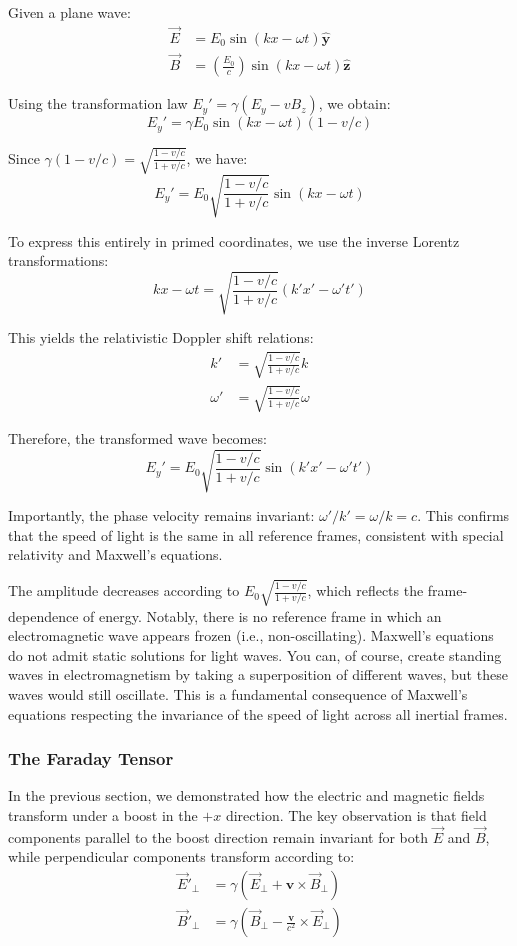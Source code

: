 \documentclass{article}
\begin{document}
Given a plane wave:
\begin{align*}
\vec{E} &= E_0 \sin(kx - \omega t) \hat{\mathbf{y}} \\
\vec{B} &= (\frac{E_0}{c}) \sin(kx - \omega t) \hat{\mathbf{z}}
\end{align*}

Using the transformation law $E_y' = \gamma(E_y - vB_z)$, we obtain:
\[E_y' = \gamma E_0 \sin(kx - \omega t)(1 - v/c)\]

Since $\gamma(1 - v/c) = \sqrt{\frac{1 - v/c}{1 + v/c}}$, we have:
\[E_y' = E_0 \sqrt{\frac{1 - v/c}{1 + v/c}} \sin(kx - \omega t)\]

To express this entirely in primed coordinates, we use the inverse Lorentz transformations:
\[kx - \omega t = \sqrt{\frac{1 - v/c}{1 + v/c}}(k'x' - \omega' t')\]

This yields the relativistic Doppler shift relations:
\begin{align*}
k' &= \sqrt{\frac{1 - v/c}{1 + v/c}} k \\
\omega' &= \sqrt{\frac{1 - v/c}{1 + v/c}} \omega
\end{align*}

Therefore, the transformed wave becomes:
\[E_y' = E_0 \sqrt{\frac{1 - v/c}{1 + v/c}} \sin(k'x' - \omega' t')\]

Importantly, the phase velocity remains invariant: $\omega'/k' = \omega/k = c$. This confirms that the speed of light is the same in all reference frames, consistent with special relativity and Maxwell's equations.

The amplitude decreases according to $E_0 \sqrt{\frac{1 - v/c}{1 + v/c}}$, which reflects the frame-dependence of energy. Notably, there is no reference frame in which an electromagnetic wave appears frozen (i.e., non-oscillating). Maxwell's equations do not admit static solutions for light waves. You can, of course, create standing waves in electromagnetism by taking a superposition of different waves, but these waves would still oscillate. This is a fundamental consequence of Maxwell's equations respecting the invariance of the speed of light across all inertial frames.

\subsubsection{The Faraday Tensor}
In the previous section, we demonstrated how the electric and magnetic fields transform under a boost in the $+x$ direction. The key observation is that field components parallel to the boost direction remain invariant for both $\vec{E}$ and $\vec{B}$, while perpendicular components transform according to:
\begin{align*}
\vec{E}'_\perp &= \gamma(\vec{E}_\perp + \mathbf{v} \times \vec{B}_\perp) \\
\vec{B}'_\perp &= \gamma\left(\vec{B}_\perp - \frac{\mathbf{v}}{c^2} \times \vec{E}_\perp\right)
\end{align*}
\end{document}
